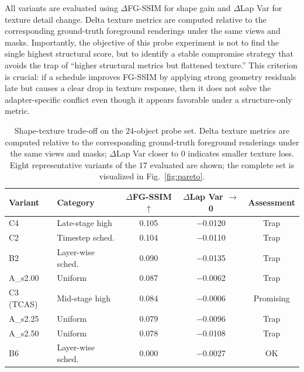 \documentclass[times,twocolumn,final]{elsarticle}
\begin{document}
All variants are evaluated using $\Delta$FG-SSIM for shape gain and $\Delta$Lap Var for texture detail change. Delta texture metrics are computed relative to the corresponding ground-truth foreground renderings under the same views and masks. Importantly, the objective of this probe experiment is not to find the single highest structural score, but to identify a stable compromise strategy that avoids the trap of ``higher structural metrics but flattened texture.'' This criterion is crucial: if a schedule improves FG-SSIM by applying strong geometry residuals late but causes a clear drop in texture response, then it does not solve the adapter-specific conflict even though it appears favorable under a structure-only metric.

\begin{table}[t]
\centering
\caption{Shape-texture trade-off on the 24-object probe set. Delta texture metrics are computed relative to the corresponding ground-truth foreground renderings under the same views and masks; $\Delta$Lap Var closer to 0 indicates smaller texture loss. Eight representative variants of the 17 evaluated are shown; the complete set is visualized in Fig.~\ref{fig:pareto}.}
\label{tab:probe}
\footnotesize\setlength{\tabcolsep}{3pt}
\begin{tabular}{llccc}
\toprule
Variant & Category & $\Delta$FG-SSIM$\uparrow$ & $\Delta$Lap Var $\to$ 0 & Assessment \\
\midrule
C4 & Late-stage high & 0.105 & $-$0.0120 & Trap \\
C2 & Timestep sched. & 0.104 & $-$0.0110 & Trap \\
B2 & Layer-wise sched. & 0.090 & $-$0.0135 & Trap \\
A\_s2.00 & Uniform & 0.087 & $-$0.0062 & Trap \\
C3 (TCAS) & Mid-stage high & 0.084 & $-$0.0006 & Promising \\
A\_s2.25 & Uniform & 0.079 & $-$0.0096 & Trap \\
A\_s2.50 & Uniform & 0.078 & $-$0.0108 & Trap \\
B6 & Layer-wise sched. & 0.000 & $-$0.0027 & OK \\
\bottomrule
\end{tabular}
\end{table}
\end{document}
